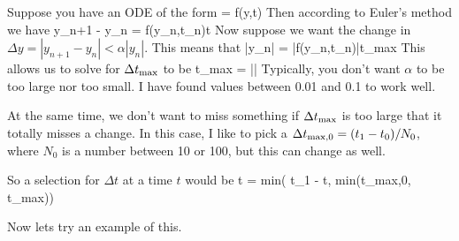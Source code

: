 Suppose you have an ODE of the form
\be
{} = f(y,t)
\ee
Then according to Euler's method we have
\be
y_{n+1} - y_n = f(y_n,t_n)\Delta t
\ee
Now suppose we want the change in $\Delta y = |y_{n+1} - y_n| < \alpha |y_n|$.  This means that
\be
\alpha |y_n| = |f(y_n,t_n)|\Delta t_{\rm max}
\ee
This allows us to solve for $\Delta t_{\rm max}$ to be
\be
\Delta t_{\rm max} = \alpha \left|\right|
\ee
Typically, you don't want $\alpha$ to be too large nor too small.  I have found values between 0.01 and 0.1 to work well.  

At the same time, we don't want to miss something if $\Delta t_{\rm max}$ is too large that it totally misses a change.  In this case, I like to pick a $\Delta t_{\rm max,0} = (t_1 - t_0)/N_0$, where $N_0$ is a number between 10 or 100, but this can change as well.

So a selection for $\Delta t$ at a time $t$ would be
\be
\Delta t = min( t_1 - t, min(\Delta t_{\rm max,0}, \Delta t_{\rm max}))
\ee

Now lets try an example of this.